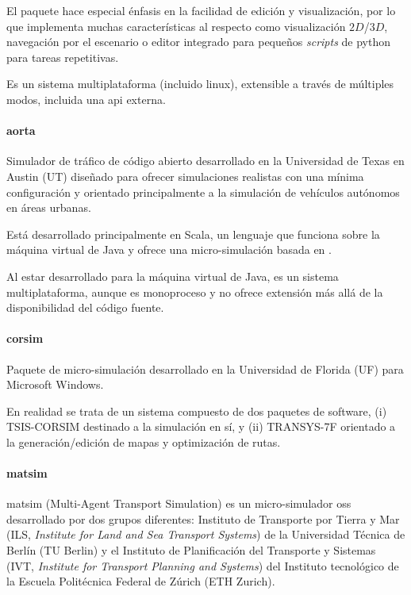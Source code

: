 El paquete hace especial énfasis en la facilidad de edición y visualización, por lo que implementa muchas características al respecto como visualización $2D$/$3D$, navegación por el escenario o editor integrado para pequeños \textit{scripts} de \gls{python} para tareas repetitivas.

Es un sistema multiplataforma (incluido \gls{linux}), extensible a través de múltiples modos, incluida una \acrshort{api} externa.

\paragraph{\gls{aorta}}

Simulador de tráfico de código abierto desarrollado en la Universidad de Texas en Austin (UT) diseñado para ofrecer simulaciones realistas con una mínima configuración y orientado principalmente a la simulación de vehículos autónomos en áreas urbanas.

Está desarrollado principalmente en Scala, un lenguaje que funciona sobre la máquina virtual de Java y ofrece una micro-simulación basada en .

Al estar desarrollado para la máquina virtual de Java, es un sistema multiplataforma, aunque es monoproceso y no ofrece extensión más allá de la disponibilidad del código fuente.

\paragraph{\gls{corsim}}

Paquete de micro-simulación desarrollado en la Universidad de Florida (UF) para Microsoft Windows.

En realidad se trata de un sistema compuesto de dos paquetes de software, (i) TSIS-CORSIM destinado a la simulación en sí, y (ii) TRANSYS-7F orientado a la generación/edición de mapas y optimización de rutas.

\paragraph{\gls{matsim}}

\gls{matsim} (Multi-Agent Transport Simulation) es un micro-simulador \acrshort{oss} desarrollado por dos grupos diferentes: Instituto de Transporte por Tierra y Mar (ILS, \textit{Institute for Land and Sea Transport Systems}) de la Universidad Técnica de Berlín (TU Berlin) y el Instituto de Planificación del Transporte y Sistemas (IVT, \textit{Institute for Transport Planning and Systems}) del Instituto tecnológico de la Escuela Politécnica Federal de Zúrich (ETH Zurich).

